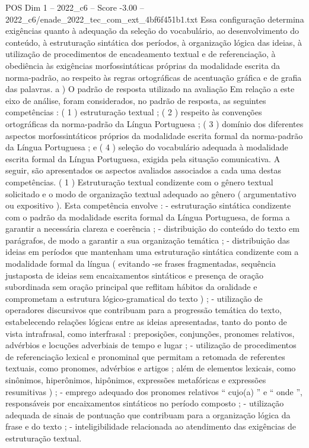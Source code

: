 \begin{textsample}{POS Dim 1 – 2022\_c6 – Score -3.00 – 2022\_c6/enade\_2022\_tec\_com\_ext\_4bf6f451b1.txt}
Essa configuração determina exigências quanto à adequação da seleção do vocabulário, ao desenvolvimento do conteúdo, à estruturação sintática dos períodos, à organização lógica das ideias, à utilização de procedimentos de encadeamento textual e de referenciação, à obediência às exigências morfossintáticas próprias da modalidade escrita da norma-padrão, ao respeito às regras ortográficas de acentuação gráfica e de grafia das palavras. a ) O padrão de resposta utilizado na avaliação Em relação a este eixo de análise, foram considerados, no padrão de resposta, as seguintes competências : ( 1 ) estruturação textual ; ( 2 ) respeito às convenções ortográficas da norma-padrão da Língua Portuguesa ; ( 3 ) domínio dos diferentes aspectos morfossintáticos próprios da modalidade escrita formal da norma-padrão da Língua Portuguesa ; e ( 4 ) seleção do vocabulário adequada à modalidade escrita formal da Língua Portuguesa, exigida pela situação comunicativa.
A seguir, são apresentados os aspectos avaliados associados a cada uma destas competências. ( 1 ) Estruturação textual condizente com o gênero textual solicitado e o modo de organização textual adequado ao gênero ( argumentativo ou expositivo ).
Esta competência envolve : - estruturação sintática condizente com o padrão da modalidade escrita formal da Língua Portuguesa, de forma a garantir a necessária clareza e coerência ; - distribuição do conteúdo do texto em parágrafos, de modo a garantir a sua organização temática ; - distribuição das ideias em períodos que mantenham uma estruturação sintática condizente com a modalidade formal da língua ( evitando -se frases fragmentadas, sequência justaposta de ideias sem encaixamentos sintáticos e presença de oração subordinada sem oração principal que reflitam hábitos da oralidade e comprometam a estrutura lógico-gramatical do texto ) ; - utilização de operadores discursivos que contribuam para a progressão temática do texto, estabelecendo relações lógicas entre as ideias apresentadas, tanto do ponto de vista intrafrasal, como interfrasal : preposições, conjunções, pronomes relativos, advérbios e locuções adverbiais de tempo e lugar ; - utilização de procedimentos de referenciação lexical e pronominal que permitam a retomada de referentes textuais, como pronomes, advérbios e artigos ; além de elementos lexicais, como sinônimos, hiperônimos, hipônimos, expressões metafóricas e expressões resumitivas ) ; - emprego adequado dos pronomes relativos “ cujo(a) ” e “ onde ”, responsáveis por encaixamentos sintáticos no período composto ; - utilização adequada de sinais de pontuação que contribuam para a organização lógica da frase e do texto ; - inteligibilidade relacionada ao atendimento das exigências de estruturação textual.

\end{textsample}
